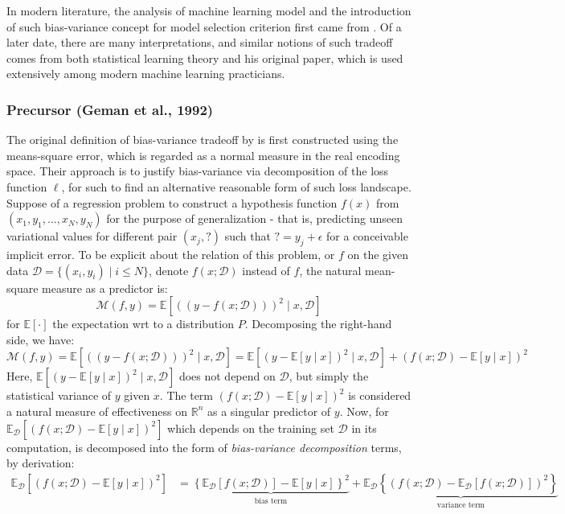 In modern literature, the analysis of machine learning model and the introduction of such bias-variance concept for model selection criterion first came from \cite{6797087}. Of a later date, there are many interpretations, and similar notions of such tradeoff comes from both statistical learning theory and his original paper, which is used extensively among modern machine learning practicians. 
\subsubsection{Precursor (Geman et al., 1992)}

The original definition of bias-variance tradeoff by \cite{6797087} is first constructed using the means-square error, which is regarded as a normal measure in the real encoding space. Their approach is to justify bias-variance via decomposition of the loss function $\ell$, for such to find an alternative reasonable form of such loss landscape. Suppose of a regression problem to construct a hypothesis function $f(x)$ from $(x_{1},y_{1},\dots,x_{N},y_{N})$ for the purpose of generalization - that is, predicting unseen variational values for different pair $(x_{j}, \mathord{?})$ such that $\mathord{?}=y_{j}+\epsilon$ for a conceivable implicit error. To be explicit about the relation of this problem, or $f$ on the given data $\mathcal{D}=\{(x_i, y_i)\mid i \leq N\}$, denote $f(x;\mathcal{D})$ instead of $f$, the natural mean-square measure as a predictor is: 
\begin{equation}
    \mathcal{M}(f,y) = \mathbb{E} \left[((y-f(x;\mathcal{D})))^{2}\mid x, \mathcal{D}\right] 
\end{equation} for $\mathbb{E}[\cdot]$ the expectation wrt to a distribution $P$. Decomposing the right-hand side, we have: 
\begin{equation}
    \mathcal{M}(f,y) = \mathbb{E} \left[((y-f(x;\mathcal{D})))^{2}\mid x, \mathcal{D}\right] = \mathbb{E}\left[(y-\mathbb{E}[y\mid x])^{2}\mid x,\mathcal{D}\right] + (f(x;\mathcal{D})-\mathbb{E}[y\mid x])^{2}
\end{equation}
Here, $\mathbb{E}\left[(y-\mathbb{E}[y\mid x])^{2}\mid x,\mathcal{D}\right]$ does not depend on $\mathcal{D}$, but simply the statistical variance of $y$ given $x$. The term $(f(x;\mathcal{D})-\mathbb{E}[y\mid x])^{2}$ is considered a natural measure of effectiveness on $\mathbb{R}^{n}$ as a singular predictor of $y$. Now, for $\mathbb{E}_{\mathcal{D}}\left[(f(x;\mathcal{D})-\mathbb{E}[y\mid x])^{2}\right]$ which depends on the training set $\mathcal{D}$ in its computation, is decomposed into the form of \textit{bias-variance decomposition} terms, by derivation: 
\begin{equation}
    \begin{split}
        \mathbb{E}_{\mathcal{D}} \left[(f(x;\mathcal{D})-\mathbb{E}[y\mid x])^{2}\right] & = \underbrace{\left\{ \mathbb{E}_{\mathcal{D}}[f(x;\mathcal{D})] - \mathbb{E}[y\mid x] \right\}^{2}}_{\text{bias term}} + \underbrace{\mathbb{E}_{\mathcal{D}} \left\{(f(x;\mathcal{D})- \mathbb{E}_{\mathcal{D}}[f(x;\mathcal{D})])^{2}\right\}}_{\text{variance term}}
    \end{split}
\end{equation}

